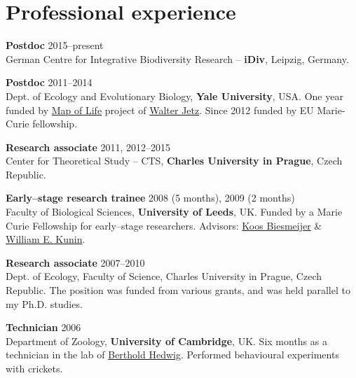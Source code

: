 \HRule

\section{Professional experience}

\begin{innerlist}

\item[]{\bf Postdoc} 
\hfill {2015--present} \\
German Centre for Integrative Biodiversity Research -- \textbf{iDiv}, Leipzig, Germany.\\

\item[]{\bf Postdoc} 
\hfill {2011--2014} \\
Dept. of Ecology and Evolutionary Biology, {\bf Yale University}, USA. One year funded by \href{http://www.mappinglife.org/}{Map of Life} project of \href{http://jetzlab.yale.edu/people/walter-jetz}{Walter Jetz}. Since 2012 funded by EU Marie-Curie fellowship.\\

\item[]{\bf Research associate} 
\hfill {2011, 2012--2015} \\ 
Center for Theoretical Study -- CTS, {\bf Charles University in Prague}, Czech Republic. \\

\item[]{\bf Early--stage research trainee} 
\hfill {2008 (5 months), 2009 (2 months)} \\ 
Faculty of Biological Sciences, {\bf University of Leeds}, UK. 
Funded by a Marie Curie Fellowship for early--stage researchers. Advisors: \href{http://www.fbs.leeds.ac.uk/staff/profile.php?tag=Biesmeijer}{Koos Biesmeijer} \& \href{http://www.fbs.leeds.ac.uk/staff/profile.php?tag=Kunin}{William E. Kunin}.\\

\item[]{\bf Research associate} 
\hfill {2007--2010} \\ 
Dept. of Ecology, Faculty of Science, Charles University in Prague, Czech Republic. The position was funded from various grants, and was held parallel to my Ph.D. studies.\\

\item[]{\bf Technician}
\hfill {2006}\\
Department of Zoology, {\bf University of Cambridge}, UK. Six months as a technician in the lab of \href{http://www.zoo.cam.ac.uk/zoostaff/hedwig/index.html}{Berthold Hedwig}. Performed behavioural experiments with crickets.\\\\\\\\

\end{innerlist}

